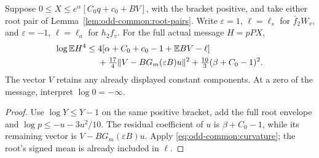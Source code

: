 \begin{lemma}
\label{lem:odd-common:root-interface}
Suppose \(0\le X\le e^\alpha[C_0q+c_0+BV]\), with the bracket positive,
and take either root pair of Lemma~\ref{lem:odd-common:root-pairs}.
Write \(\varepsilon=1\), \(\ell=\ell_s\) for \(\bar f_2W_v\),
and \(\varepsilon=-1\), \(\ell=\ell_a\) for \(h_2f_v\).
For the full actual message \(H=pPX\),
\begin{equation}\label{eq:odd-common:root-interface}
\begin{aligned}
 \log\mathbb E H^4\le{}&4[\alpha+C_0+c_0-1+\mathbb E BV-\ell]\\
 &+\tfrac{17}{4}\|V-BG_m(\varepsilon B)u\|^2
       +\tfrac{10}{3}(\beta+C_0-1)^2.
\end{aligned}
\end{equation}
The vector \(V\) retains any already displayed constant components.
At a zero of the message, interpret \(\log0=-\infty\).
\end{lemma}
\begin{proof}
Use \(\log Y\le Y-1\) on the same positive bracket, add the full
root envelope and \(\log p\le-u-3u^2/10\).
The residual coefficient of \(u\) is \(\beta+C_0-1\), while its
remaining vector is \(V-BG_m(\varepsilon B)u\).
Apply \eqref{eq:odd-common:curvature}; the root's signed mean is
already included in \(\ell\).
\end{proof}

